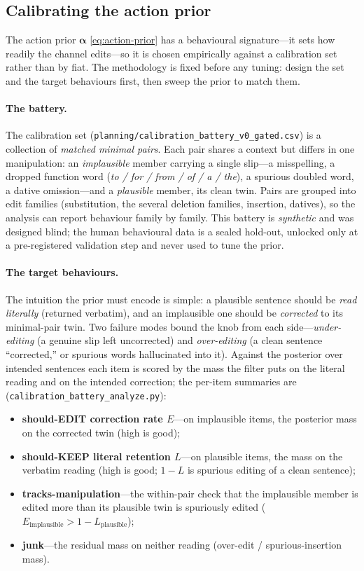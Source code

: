 \documentclass[11pt]{article}
\providecommand{\code}[1]{\texttt{#1}}
\begin{document}
\subsection{Calibrating the action prior}
\label{sec:calibration}

The action prior $\bm\alpha$ \eqref{eq:action-prior} has a behavioural signature---it sets how readily the channel edits---so it is chosen empirically against a calibration set rather than by fiat. The methodology is fixed before any tuning: design the set and the target behaviours first, then sweep the prior to match them.

\paragraph{The battery.} The calibration set (\code{planning/calibration\_battery\_v0\_gated.csv}) is a collection of \emph{matched minimal pairs}. Each pair shares a context but differs in one manipulation: an \emph{implausible} member carrying a single slip---a misspelling, a dropped function word (\emph{to / for / from / of / a / the}), a spurious doubled word, a dative omission---and a \emph{plausible} member, its clean twin. Pairs are grouped into edit families (substitution, the several deletion families, insertion, datives), so the analysis can report behaviour family by family. This battery is \emph{synthetic} and was designed blind; the human behavioural data is a sealed hold-out, unlocked only at a pre-registered validation step and never used to tune the prior.

\paragraph{The target behaviours.} The intuition the prior must encode is simple: a plausible sentence should be \emph{read literally} (returned verbatim), and an implausible one should be \emph{corrected} to its minimal-pair twin. Two failure modes bound the knob from each side---\emph{under-editing} (a genuine slip left uncorrected) and \emph{over-editing} (a clean sentence ``corrected,'' or spurious words hallucinated into it). Against the posterior over intended sentences each item is scored by the mass the filter puts on the literal reading and on the intended correction; the per-item summaries are (\code{calibration\_battery\_analyze.py}):
\begin{itemize}[leftmargin=1.6em,itemsep=1pt]
\item \textbf{should-EDIT correction rate $E$}---on implausible items, the posterior mass on the corrected twin (high is good);
\item \textbf{should-KEEP literal retention $L$}---on plausible items, the mass on the verbatim reading (high is good; $1-L$ is spurious editing of a clean sentence);
\item \textbf{tracks-manipulation}---the within-pair check that the implausible member is edited more than its plausible twin is spuriously edited ($E_{\text{implausible}} > 1-L_{\text{plausible}}$);
\item \textbf{junk}---the residual mass on neither reading (over-edit / spurious-insertion mass).
\end{itemize}
\end{document}
